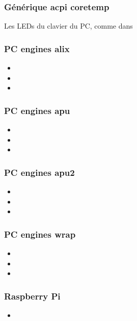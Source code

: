 \subsubsection{Générique acpi coretemp}
Les LEDs du clavier du PC, comme dans 

\subsubsection{PC engines alix}
\begin{itemize}
  \item {}
  \item {}
  \item {}
\end{itemize}

\subsubsection{PC engines apu}
\begin{itemize}
  \item {}
  \item {}
  \item {}
\end{itemize}

\subsubsection{PC engines apu2}
\begin{itemize}
  \item {}
  \item {}
  \item {}
\end{itemize}

\subsubsection{PC engines wrap}
\begin{itemize}
  \item {}
  \item {}
  \item {}
\end{itemize}

\subsubsection{Raspberry Pi}
\begin{itemize}
  \item {}
\end{itemize}

